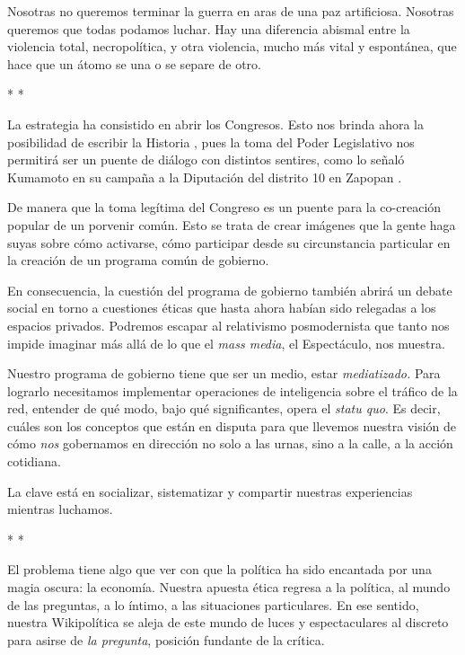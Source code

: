 Nosotras no queremos terminar la guerra en aras de una paz artificiosa.
Nosotras queremos que todas podamos luchar. Hay una diferencia abismal
entre la violencia total, necropolítica, y otra violencia, mucho más
vital y espontánea, que hace que un átomo se una o se separe de otro.

\begin{center}
    * *
\end{center}

La estrategia ha consistido en abrir los Congresos. Esto nos brinda
ahora la posibilidad de escribir la Historia \cite{HegelFilosofiaHistoria2023},
pues la toma del Poder Legislativo nos permitirá ser un puente de
diálogo con distintos sentires, como lo señaló Kumamoto en su campaña a
la Diputación del distrito 10 en
Zapopan \cite{Gutierrez2016}.

De manera que la toma legítima del Congreso es un puente para la
co-creación popular de un porvenir común. Esto se trata de crear
imágenes que la gente haga suyas sobre cómo activarse, cómo participar
desde su circunstancia particular en la creación de un programa común de
gobierno.

En consecuencia, la cuestión del programa de gobierno también abrirá un
debate social en torno a cuestiones éticas que hasta ahora habían sido
relegadas a los espacios privados. Podremos escapar al relativismo
posmodernista que tanto nos impide imaginar más allá de lo que el
\emph{mass media}, el Espectáculo, nos muestra.

Nuestro programa de gobierno tiene que ser un medio, estar
\emph{mediatizado.} Para lograrlo necesitamos implementar operaciones de
inteligencia sobre el tráfico de la red, entender de qué modo, bajo qué
significantes, opera el \emph{statu quo}. Es decir, cuáles son los
conceptos que están en disputa para que llevemos nuestra visión de cómo
\emph{nos} gobernamos en dirección no solo a las urnas, sino a la calle,
a la acción cotidiana.

La clave está en socializar, sistematizar y compartir nuestras
experiencias mientras luchamos.

\begin{center}
    * *
\end{center}

El problema tiene algo que ver con que la política ha sido encantada por
una magia oscura: la economía. Nuestra apuesta ética regresa a la
política, al mundo de las preguntas, a lo íntimo, a las situaciones
particulares. En ese sentido, nuestra Wikipolítica se aleja de este
mundo de luces y espectaculares al discreto para asirse de \emph{la
pregunta}, posición fundante de la crítica.

